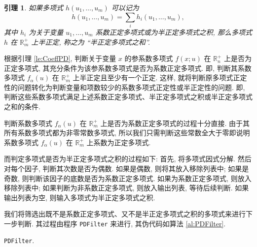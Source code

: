 \documentclass[10pt,a4paper]{ctexart}
\newtheorem{Lemma}{引理}
\begin{document}
\begin{Lemma}\label{le:SemiPDSum}
  如果多项式 $h(u_1, \dots, u_m)$ 可以记为
  \begin{equation*}
    h(u_1, \dots, u_m) =  \sum_{i} h_i(u_1, \dots, u_m),
  \end{equation*}
  其中 $h_i$ 为关于变量 $u_1, \dots, u_m$ 系数正定多项式或为半正定多项式之积, 那么多项式 $h$ 在 $\mathbb{R}_m^+$ 上半正定, 称之为 ``半正定多项式之和''.
\end{Lemma}

根据引理 \ref{le:CoeffPD}, 判断关于变量 $x$ 的参系数多项式 $f(x;u)$ 在 $\mathbb{R}_n^+$ 上是否为正定多项式, 其充分条件为该参系数多项式是否为系数正定多项式. 即, 判断其系数多项式 $f_\alpha(u)$ 在 $\mathbb{R}_m^+$ 上半正定且至少有一个正定. 这样, 就将判断原多项式正定性的问题转化为判断变量和项数较少的系数多项式正定性或半正定性的问题. 即, 判断这些系数多项式满足上述系数正定多项式、半正定多项式之积或半正定多项式之和的条件.

判断系数多项式 $f_{\alpha}(u)$ 在 $\mathbb{R}_m^+$ 上是否为系数正定多项式的过程十分直接. 由于其所有系数多项式都为非零常数多项式, 所以我们只需判断这些常数全大于零即说明系数多项式 $f_{\alpha}(u)$ 在 $\mathbb{R}_m^+$ 上系数为正定多项式.

而判定多项式是否为半正定多项式之积的过程如下: 首先, 将多项式因式分解. 然后对每个因子, 判断其次数是否为偶数. 如果是偶数, 则将其放入移除列表中; 如果是奇数, 则判断该因子的底数是否为系数正定多项式. 如果为系数正定多项式, 则放入移除列表中; 如果判断为非系数正定多项式, 则放入输出列表, 等待后续判断. 如果输出列表为空, 则输入多项式为半正定多项式之积.

我们将筛选出既不是系数正定多项式、又不是半正定多项式之积的多项式来进行下一步判断. 其过程由程序 \texttt{PDFilter} 来进行, 其伪代码如算法 \ref{al:PDFilter}.

\begin{algorithm}[!ht]
\caption{\texttt{PDFilter}.\label{al:PDFilter}}
\end{algorithm}
\end{document}
